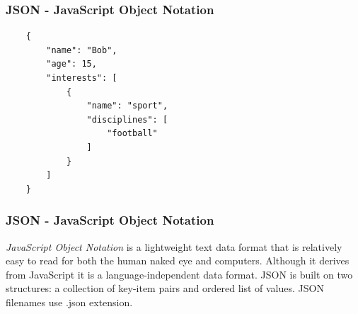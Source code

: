 \begin{frame}[fragile]
    \frametitle{JSON - JavaScript Object Notation}
    \begin{verbatim}
    {
        "name": "Bob",
        "age": 15,
        "interests": [
            {
                "name": "sport",
                "disciplines": [
                    "football"
                ]
            }
        ]
    }
    \end{verbatim}
    \end{frame}

\begin{frame}
    \frametitle{JSON - JavaScript Object Notation}
    \begin{definition}
        \emph{JavaScript Object Notation} is a lightweight text data format that is relatively easy to read for both the human naked eye and computers. Although it derives from JavaScript it is a language-independent data format. JSON is built on two structures: a collection of key-item pairs and ordered list of values. JSON filenames use .json extension.
    \end{definition}
\end{frame}




